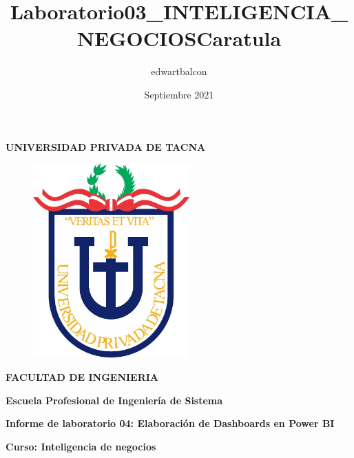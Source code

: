 \documentclass{article}
\title{Laboratorio03_INTELIGENCIA_NEGOCIOS}
\author{edwartbalcon}
\date{Septiembre 2021}
\begin{document}
\title{Caratula}

\begin{titlepage}
\begin{center}
\begin{Large}
\textbf{UNIVERSIDAD PRIVADA DE TACNA} \\
\end{Large}
\vspace*{-0.025in}
\begin{figure}[htb]
\begin{center}
\includegraphics[width=6cm]{./images/logo_UPT}
\end{center}
\end{figure}
\vspace*{-0.025in}
\begin{Large}
\textbf{FACULTAD DE INGENIERIA} \\
\end{Large}
\vspace*{0.05in}
\begin{Large}
\textbf{Escuela Profesional de Ingeniería de Sistema} \\
\end{Large}


\vspace*{0.4in}

\vspace*{0.1in}
\begin{Large}
\textbf{Informe de laboratorio 04: Elaboración de Dashboards en Power BI} \\
\end{Large}

\vspace*{0.3in}
\begin{Large}
\textbf{Curso: Inteligencia de negocios} \\
\end{Large}


\end{center}
\end{titlepage}
\end{document}
